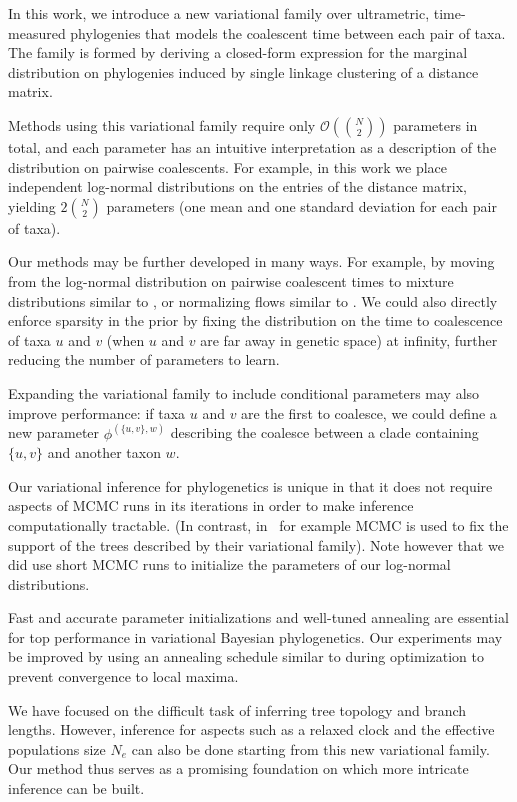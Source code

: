 In this work, we introduce a new variational family over ultrametric, time-measured phylogenies that models the coalescent time between each pair of taxa. The family is formed by deriving a closed-form expression for the marginal distribution on phylogenies induced by single linkage clustering of a distance matrix. 

Methods using this variational family require only $\mathcal{O}(\binom{N}{2})$ parameters in total, and each parameter has an intuitive interpretation as a description of the distribution on pairwise coalescents. For example, in this work we place independent log-normal distributions on the entries of the distance matrix, yielding $2\binom{N}{2}$ parameters (one mean and one standard deviation for each pair of taxa).

Our methods may be further developed in many ways. For example, by moving from the log-normal distribution on pairwise coalescent times to  mixture distributions similar to \citet{Molen:2024}, or normalizing flows similar to \citet{Zhang:2020}. We could also directly enforce sparsity in the prior by fixing the distribution on the time to coalescence of taxa $u$ and $v$ (when $u$ and $v$ are far away in genetic space) at infinity, further reducing the number of parameters to learn.  

Expanding the variational family to include conditional parameters may also improve performance: if taxa $u$ and $v$ are the first to coalesce, we could define a new parameter $\phi^{(\{u,v\},w)}$ describing the coalesce between a clade containing $\{u,v\}$ and  another taxon $w$. 

Our variational inference for phylogenetics is unique in that it does not require  aspects of MCMC runs in its iterations in order to make inference computationally tractable. (In contrast, in~\citealt{Zhang:2024} for example MCMC is used to fix the support of the trees described by their variational family). Note however that we did use short MCMC runs to initialize the parameters of our log-normal distributions.

Fast and accurate parameter initializations and well-tuned annealing are essential for top performance in variational Bayesian phylogenetics. Our experiments may be improved by using  an annealing schedule similar to \citet{Zhang:2024} during optimization to prevent convergence to local maxima.

We have focused on the difficult task of inferring tree topology and branch lengths. However, inference for aspects such as a relaxed clock \citep[see][]{Douglas:2021} and the effective populations size $N_e$ can also be done starting from this new variational family. Our method thus serves as a promising foundation on which more intricate inference can be built.

